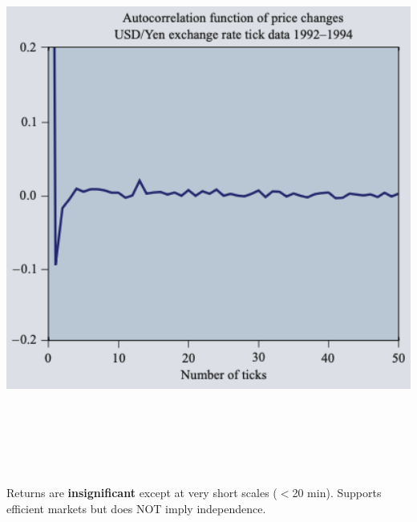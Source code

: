 \documentclass[final]{beamer}
\begin{document}
\begin{frame}[t]
\begin{columns}[t]
\begin{column}{.48\linewidth}
\begin{tcolorbox}[mybox, title=Linear Autocorrelations]
\begin{center}
\includegraphics[width=0.95\linewidth,height=18cm,keepaspectratio]{figure6_autocorr.png}
\end{center}
\vspace{0.3cm}
\large
Returns are \textbf{insignificant} except at very short scales ($<$20 min). Supports efficient markets but does NOT imply independence.
\end{tcolorbox}




\end{column}
\end{columns}
\end{frame}
\end{document}
